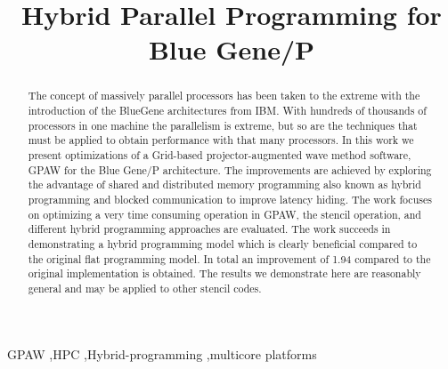 \documentclass[preprint,3p,times,twocolumn]{elsarticle}
\begin{document}
\begin{frontmatter}



\title{Hybrid Parallel Programming for Blue Gene/P}



\begin{abstract}
The concept of massively parallel processors has been taken to the extreme with the introduction of the BlueGene architectures from IBM. With hundreds of thousands of processors in one machine the parallelism is extreme, but so are the techniques that must be applied to obtain performance with that many processors. 
In this work we present optimizations of a Grid-based projector-augmented wave method software, GPAW \cite{Mortensen05} for the Blue Gene/P architecture. The improvements are achieved by exploring the advantage of shared and distributed memory programming also known as hybrid programming and blocked communication to improve latency hiding. The work focuses on optimizing a very time consuming operation in GPAW, the stencil operation, and different hybrid programming approaches are evaluated. The work succeeds in demonstrating a hybrid programming model which is clearly beneficial compared to the original flat programming model. In total an improvement of 1.94 compared to the original implementation is obtained. The results we demonstrate here are reasonably general and may be applied to other stencil codes.
\end{abstract}

\begin{keyword}
GPAW \sep HPC \sep Hybrid-programming \sep multicore platforms


\end{keyword}

\end{frontmatter}
\end{document}
